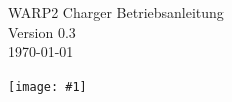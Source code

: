 \documentclass[a4paper,10pt]{article}
\title{}
\author{}
\newcommand{\gfx}[1]{\texttt{[image: \#1]}}
\begin{document}
\pagestyle{empty}
\begin{titlepage}
	\vspace*{-3.08cm}
	\colorbox{boxgray}{}
	\vfill
	\begin{center}
		\Huge
		WARP2 Charger Betriebsanleitung\\\vspace{1cm}
		\large
		Version 0.3\\\vspace{0.25cm}
		\today
	\end{center}
	\vfill \gfx{./img_warp2/resized/warp_perspective_blue_ready}
\end{titlepage}
\newpage
\null
\newpage
\pagestyle{fancy}
\end{document}
